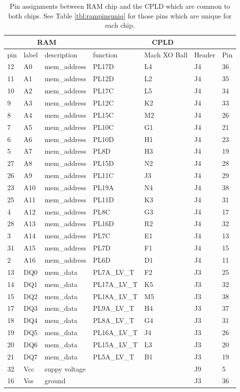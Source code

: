 \documentclass{article}
\begin{document}
\begin{table}
\center
\begin{tabular}{|l|l|l|l|l|l|l|}
	\hline
	\multicolumn{3}{|c|}{\textbf{RAM}} & \multicolumn{4}{|c|}{\textbf{CPLD}} \\
	\hline
	pin & label & description &  function & Mach XO Ball & Header & Pin \\
	\hline
	12 & A0 & mem\_address & PL17D & L4 & J4 & 36 \\
	\hline
	11 & A1 & mem\_address & PL12D & L2 & J4 & 35 \\
	\hline
	10 & A2 & mem\_address & PL17C & L5 & J4 & 34 \\
	\hline
	9 & A3 & mem\_address & PL12C & K2 & J4 & 33 \\
	\hline
	8 & A4 & mem\_address & PL15C & M2 & J4 & 26 \\
	\hline
	7 & A5 & mem\_address & PL10C & G1 & J4 & 21 \\
	\hline
	6 & A6 & mem\_address & PL10D & H1 & J4 & 23 \\
	\hline
	5 & A7 & mem\_address & PL8D & H3 & J4 & 19 \\
	\hline
	27 & A8 & mem\_address & PL15D & N2 & J4 & 28 \\
	\hline
	26 & A9 & mem\_address & PL11C & J3 & J4 & 29 \\
	\hline
	23 & A10 & mem\_address & PL19A & N4 & J4 & 38 \\
	\hline
	25 & A11 & mem\_address & PL11D & K3 & J4 & 31 \\
	\hline
	4 & A12 & mem\_address & PL8C & G3 & J4 & 17 \\
	\hline
	28 & A13 & mem\_address & PL16D & R2 & J4 & 32 \\
	\hline
	3 & A14 & mem\_address & PL7C & E1 & J4 & 13 \\
	\hline
	31 & A15 & mem\_address & PL7D & F1 & J4 & 15 \\
	\hline
	2 & A16 & mem\_address & PL6D & D1 & J4 & 11 \\
	\hline
	13 & DQ0 & mem\_data & PL7A\_LV\_T & F2 & J3 & 25 \\
	\hline
	14 & DQ1 & mem\_data & PL17A\_LV\_T & K5 & J3 & 32 \\
	\hline
	15 & DQ2 & mem\_data & PL18A\_LV\_T & M5 & J3 & 38 \\
	\hline
	17 & DQ3 & mem\_data & PL9A\_LV\_T & H4 & J3 & 37 \\
	\hline
	18 & DQ4 & mem\_data & PL8A\_LV\_T & G4 & J3 & 31 \\
	\hline
	19 & DQ5 & mem\_data & PL16A\_LV\_T & J4 & J3 & 26 \\
	\hline
	20 & DQ6 & mem\_data & PL15A\_LV\_T & L3 & J3 & 20 \\
	\hline
	21 & DQ7 & mem\_data & PL5A\_LV\_T & B1 & J3 & 19 \\
	\hline
	32 & Vcc & suppy voltage & & & J9 & 5 \\
	\hline
	16 & Vss & ground & & & J3 & 36 \\
	\hline
\end{tabular}
\caption{Pin assignments between RAM chip and the CPLD
which are common to both chips.
See Table \ref{tbl:rampinsuniq} for those pins which are
unique for each chip.
}
\label{tbl:ramcommon}
\end{table}
\end{document}
